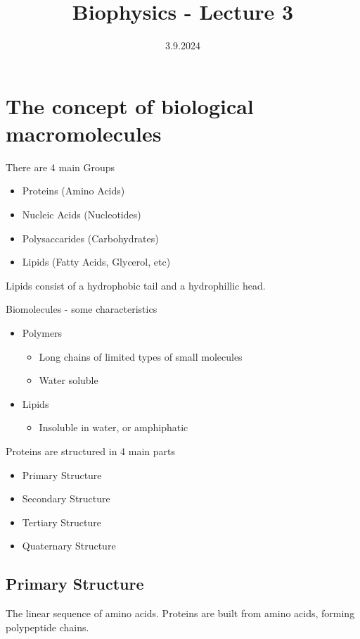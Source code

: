\documentclass[]{scrartcl}
\title{Biophysics - Lecture 3}
\author{}
\date{3.9.2024}
\begin{document}
\maketitle
\newpage
\tableofcontents
\newpage

\section{The concept of biological macromolecules}

There are 4 main Groups
\begin{itemize}
	\item Proteins (Amino Acids)
	\item Nucleic Acids (Nucleotides)
	\item Polysaccarides (Carbohydrates)
	\item Lipids (Fatty Acids, Glycerol, etc)
\end{itemize}

Lipids consist of a hydrophobic tail and a hydrophillic head.

Biomolecules - some characteristics
\begin{itemize}
	\item Polymers
		\begin{itemize}
			\item Long chains of limited types of small molecules
			\item Water soluble
		\end{itemize}
	\item Lipids
		\begin{itemize}
			\item Insoluble in water, or amphiphatic
		\end{itemize}
\end{itemize}

Proteins are structured in 4 main parts
\begin{itemize}
	\item Primary Structure
	\item Secondary Structure
	\item Tertiary Structure
	\item Quaternary Structure
\end{itemize}
\subsection{Primary Structure}
The linear sequence of amino acids. Proteins are built from amino acids, forming polypeptide chains.
\end{document}
